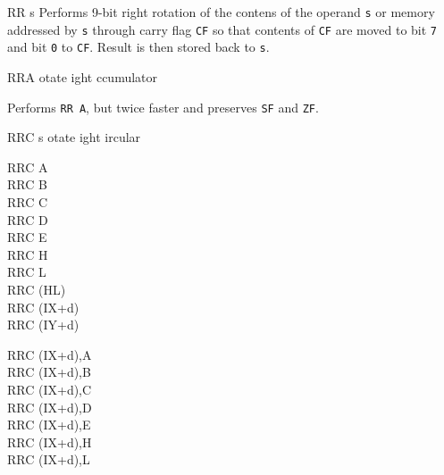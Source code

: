 \documentclass[12pt,twoside,openright,a4paper]{book}
\begin{document}
\begin{basedescript}{
	\desclabelstyle{\multilinelabel}
	\desclabelwidth{3cm}}
\begin{DetailItem}{RR s}
		Performs 9-bit right rotation of the contens of the operand {\tt s} or memory addressed by {\tt s} through carry flag {\tt CF} so that contents of {\tt CF} are moved to bit {\tt 7} and bit {\tt 0} to {\tt CF}. Result is then stored back to {\tt s}.

		\begin{DetailEffects}[p]
			\FlagsRRr
		\end{DetailEffects}
						
		\begin{DetailTiming}
		\end{DetailTiming}

	\end{DetailItem}

	\begin{DetailItem}{RRA}
		{otate ight ccumulator}
		{\SymRR{A}}

		Performs {\tt RR A}, but twice faster and preserves {\tt SF} and {\tt ZF}.

		\begin{DetailEffects}
			\FlagsRRA
		\end{DetailEffects}
						
		\begin{DetailTiming}
			\DetailTime{1}{4}
		\end{DetailTiming}

	\end{DetailItem}

	\pagebreak
	\begin{DetailItem}{RRC s}
		{otate ight ircular}
		{\SymRRC{s}}

		\begin{DetailVariants}
			RRC A\\
			RRC B\\
			RRC C\\
			RRC D\\
			RRC E\\
			RRC H\\
			RRC L\\
			RRC (HL)\\
			RRC (IX+d)\\
			RRC (IY+d)

			\columnbreak
			RRC (IX+d),A\UNDOC\\
			RRC (IX+d),B\UNDOC\\
			RRC (IX+d),C\UNDOC\\
			RRC (IX+d),D\UNDOC\\
			RRC (IX+d),E\UNDOC\\
			RRC (IX+d),H\UNDOC\\
			RRC (IX+d),L\UNDOC


\end{DetailVariants}
\end{DetailItem}
\end{basedescript}
\end{document}

